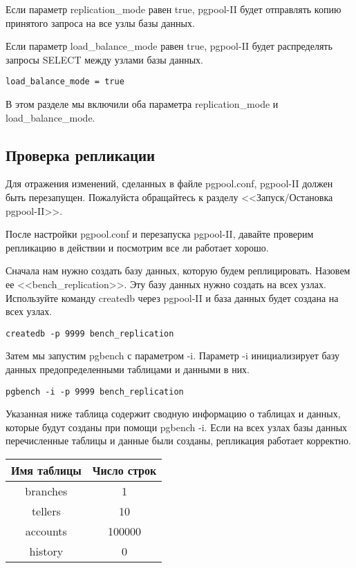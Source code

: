 Если параметр replication\_mode равен true, pgpool-II будет отправлять копию принятого запроса на все узлы базы данных.

Если параметр load\_balance\_mode равен true, pgpool-II будет распределять запросы SELECT между узлами базы данных.
\begin{lstlisting}[label=lst:pgpool18,caption=Настройка репликации]
load_balance_mode = true
\end{lstlisting}

В этом разделе мы включили оба параметра replication\_mode и load\_balance\_mode.

\subsection{Проверка репликации}
Для отражения изменений, сделанных в файле pgpool.conf, pgpool-II должен быть перезапущен. 
Пожалуйста обращайтесь к разделу <<Запуск/Остановка pgpool-II>>.

После настройки pgpool.conf и перезапуска pgpool-II, давайте проверим репликацию в действии 
и посмотрим все ли работает хорошо.

Сначала нам нужно создать базу данных, которую будем реплицировать. Назовем ее <<bench\_replication>>. 
Эту базу данных нужно создать на всех узлах. Используйте команду createdb через pgpool-II и база 
данных будет создана на всех узлах.
\begin{lstlisting}[label=lst:pgpool19,caption=Проверка репликации]
createdb -p 9999 bench_replication
\end{lstlisting}

Затем мы запустим pgbench с параметром -i. Параметр -i инициализирует базу данных предопределенными 
таблицами и данными в них.
\begin{lstlisting}[label=lst:pgpool20,caption=Проверка репликации]
pgbench -i -p 9999 bench_replication
\end{lstlisting}

Указанная ниже таблица содержит сводную информацию о таблицах и данных, которые будут созданы при помощи pgbench -i. 
Если на всех узлах базы данных перечисленные таблицы и данные были созданы, репликация работает корректно.

\begin{tabular}{ | c | c | }
  \hline
  Имя таблицы & Число строк \\
  \hline
  branches & 1 \\
  \hline
  tellers & 10 \\
  \hline
  accounts & 100000 \\
  \hline
  history & 0 \\
  \hline
\end{tabular}

